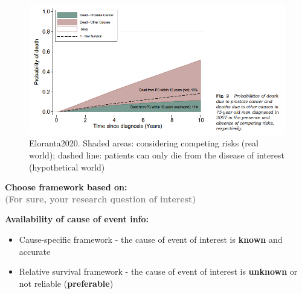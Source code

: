 \documentclass{beamer}
\begin{document}
\begin{frame}{\secname}

  \begin{figure}
    \centering
    \includegraphics[scale=0.4]{stack.png}
    \caption{Eloranta2020. Shaded areas: considering competing risks (real world); dashed line: patients can only die from the disease of interest (hypothetical world)}
    \label{fig:my_label}
\end{figure}

\end{frame}
\begin{frame}{\secname}
\textbf{Choose framework based on:} \\
\noindent \textcolor{gray}{\textbf{(For sure, your research question of interest)}}

\noindent \textbf{Availability of cause of event info:}

\begin{itemize}
    \item Cause-specific framework - the cause of event of interest is \textbf{known} and accurate
    \item Relative survival framework - the cause of event of interest is \textbf{unknown} or not reliable (\textbf{preferable})
\end{itemize}

\end{frame}
\end{document}
